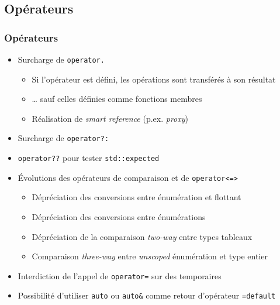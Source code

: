 \documentclass[C++.tex]{subfiles}
\begin{document}
\subsection*{Opérateurs}
\begin{frame}[fragile]
	\frametitle{Opérateurs}
	\begin{itemize}
		\item Surcharge de \lstinline|operator.|
		\begin{itemize}
			\item Si l'opérateur est défini, les opérations sont transférés à son résultat
			\item \ldots{} sauf celles définies comme fonctions membres
			\item Réalisation de \textit{smart reference} (p.ex. \textit{proxy})
		\end{itemize}
		\item Surcharge de \lstinline|operator?:|
		\item \lstinline|operator??| pour tester \lstinline|std::expected|
		\item Évolutions des opérateurs de comparaison et de \lstinline|operator<=>|
		\begin{itemize}
			\item Dépréciation des conversions entre énumération et flottant
			\item Dépréciation des conversions entre énumérations
			\item Dépréciation de la comparaison \og \textit{two-way}\fg{} entre types tableaux
			\item Comparaison \textit{three-way} entre \textit{unscoped} énumération et type entier


		\end{itemize}
		\item Interdiction de l'appel de \lstinline|operator=| sur des temporaires


		\item Possibilité d'utiliser \lstinline|auto| ou \lstinline|auto&| comme retour d'opérateur \lstinline|=default|
	\end{itemize}
\end{frame}
\end{document}

